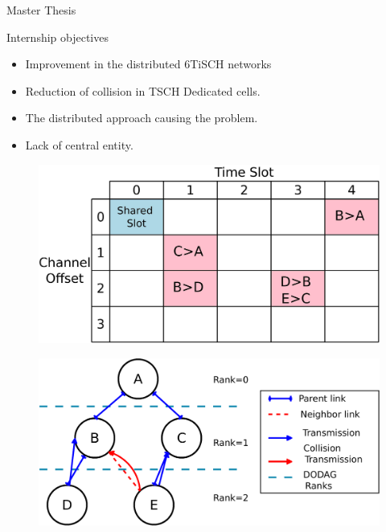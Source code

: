 \documentclass{beamer}
\begin{document}
\begin{frame}{Master Thesis}

\begin{minipage}[t]{0.48\linewidth}

\begin{block}{Internship objectives}
    \begin{itemize}
    \item Improvement in the distributed 6TiSCH networks
    \item<2-> Reduction of collision in TSCH Dedicated cells.
     \item<3-> The distributed approach causing the problem. 
      \item<4-> Lack of central entity. 
      
     
    
    \end{itemize}
    \end{block}
\end{minipage}\hfill
\begin{minipage}[t]{0.48\linewidth}
\centering
\begin{figure}[p]

\includegraphics[width=\linewidth]{TSCH.jpeg}

\end{figure}
\begin{figure}[p]


\includegraphics[width=\linewidth]{Diagram1.png}
\end{figure}
\end{minipage}
\end{frame}
\end{document}
